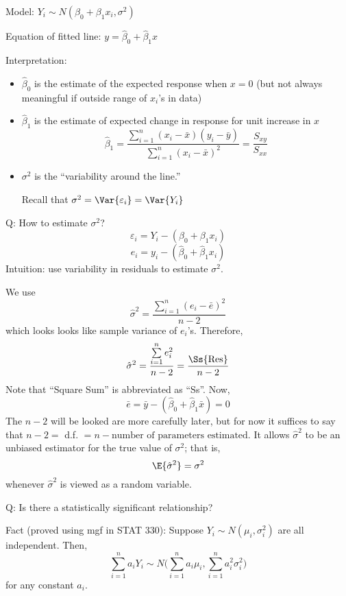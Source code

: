 Model: $ Y_i \sim N(\beta_0+\beta_1x_i,\sigma^2) $

Equation of fitted line: $ y=\hat{\beta}_0+\hat{\beta}_1x $

Interpretation:
\begin{itemize}
    \item $ \hat{\beta}_0 $ is the estimate
          of the expected response when $ x=0 $ (but not always
          meaningful if outside range of $ x_i $'s in data)
    \item $ \hat{\beta}_1 $ is the estimate of
          expected change in response for unit increase in $ x $
          \[ \hat{\beta}_1=\frac{\sum\limits_{i=1}^{n}(x_i-\bar{x})
                  (y_i-\bar{y})}{
                  \sum\limits_{i=1}^{n} (x_i-\bar{x})^2
              }=\frac{S_{xy}}{S_{xx}}   \]
    \item $ \sigma^2 $ is the
          ``variability around the line.''

          Recall that $ \sigma^2=\Var{\varepsilon_i}=\Var{Y_i} $
\end{itemize}
Q\@: How to estimate $ \sigma^2 $?
\[ \varepsilon_i=Y_i-(\beta_0+\beta_1x_i) \]
\[ e_i=y_i-(\hat{\beta}_0+\hat{\beta}_1x_i) \]
Intuition: use variability in residuals to estimate
$ \sigma^2 $.

We use \[ \hat{\sigma}^2
    =\frac{\sum\limits_{i=1}^{n} (e_i-\bar{e})^2}{n-2} \]
which looks looks like sample variance of $ e_i $'s. Therefore,
\[ \hat{\sigma}^2=\frac{\sum\limits_{i=1}^{n} e_i^2}{n-2}=
    \frac{\Ss{\text{Res}}}{n-2} \]
Note that ``Square Sum'' is abbreviated as ``Ss''. Now,
\[ \bar{e}=\bar{y}-(\hat{\beta}_0+\hat{\beta}_1\bar{x})=0 \]
The $ n-2 $ will be looked are more carefully later, but for now
it suffices to say that $ n-2= $ d.f. $ = n- \text{number of parameters
        estimated}$. It allows $ \hat{\sigma}^2 $ to be an unbiased estimator
for the true value of $ \sigma^2 $; that is,
\[ \E{\hat{\sigma}^2}=\sigma^2 \]
whenever $ \hat{\sigma}^2 $ is viewed as a random variable.

Q\@: Is there a statistically significant relationship?

Fact (proved using mgf in STAT 330): Suppose $ Y_i \sim N(\mu_i,\sigma_i^2) $
are all independent. Then,
\[ \sum\limits_{i=1}^{n} a_i Y_i \sim N
    \biggl( \sum\limits_{i=1}^{n} a_i\mu_i,\sum\limits_{i=1}^{n} a_i^2\sigma_i^2 \biggr) \]
for any constant $ a_i $.

